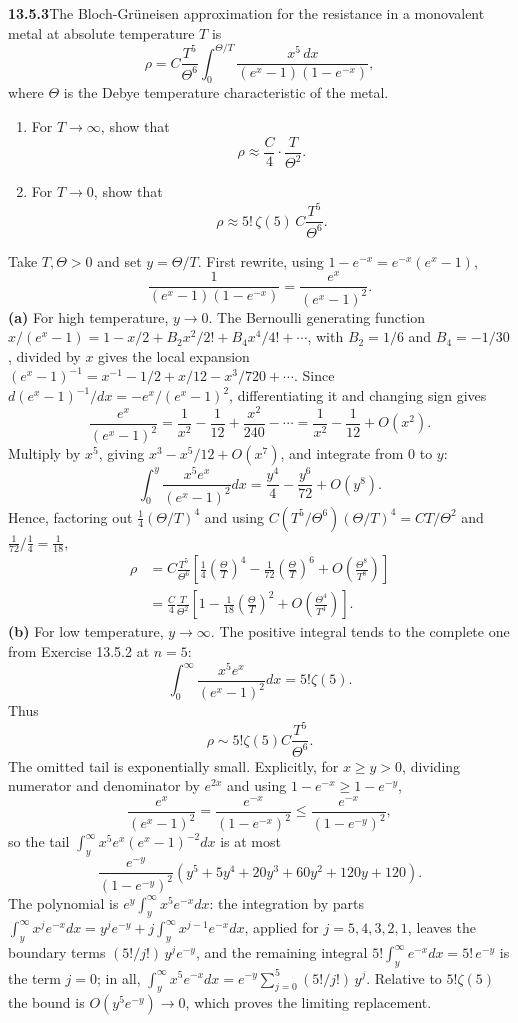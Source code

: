 \par\bigskip
\noindent\textbf{13.5.3}\quad The Bloch-Gr\"uneisen approximation for the
resistance in a monovalent metal at absolute temperature $T$ is
\[
\rho=C\frac{T^{5}}{\Theta^{6}}
\int_{0}^{\Theta/T}\frac{x^{5}\,dx}{(e^{x}-1)(1-e^{-x})},
\]
where $\Theta$ is the Debye temperature characteristic of the metal.
\begin{enumerate}
\item[(a)] For $T\to\infty$, show that
  \[
  \rho\approx\frac{C}{4}\cdot\frac{T}{\Theta^{2}}.
  \]
\item[(b)] For $T\to0$, show that
  \[
  \rho\approx5!\,\zeta(5)\,C\frac{T^{5}}{\Theta^{6}}.
  \]
\end{enumerate}
\solution
Take $T,\Theta>0$ and set $y=\Theta/T$.  First rewrite, using
$1-e^{-x}=e^{-x}(e^x-1)$,
\[
\frac1{(e^x-1)(1-e^{-x})}=\frac{e^x}{(e^x-1)^2}.
\]
\textbf{(a)} For high temperature, $y\to0$.  The Bernoulli
generating function
$x/(e^x-1)=1-x/2+B_2x^2/2!+B_4x^4/4!+\cdots$, with $B_2=1/6$ and
$B_4=-1/30$, divided by $x$ gives the local expansion
$(e^x-1)^{-1}=x^{-1}-1/2+x/12-x^3/720+\cdots$.
Since $d(e^x-1)^{-1}/dx=-e^x/(e^x-1)^2$, differentiating it and
changing sign gives
\[
\frac{e^x}{(e^x-1)^2}=\frac1{x^2}-\frac1{12}+\frac{x^2}{240}-\cdots
=\frac1{x^2}-\frac1{12}+O(x^2).
\]
Multiply by $x^5$, giving $x^3-x^5/12+O(x^7)$, and integrate
from $0$ to $y$:
\[
\int_0^y\frac{x^5e^x}{(e^x-1)^2}dx
=\frac{y^4}{4}-\frac{y^6}{72}+O(y^8).
\]
Hence, factoring out $\frac14(\Theta/T)^4$ and using
$C(T^5/\Theta^6)(\Theta/T)^4=CT/\Theta^2$ and
$\frac1{72}\big/\frac14=\frac1{18}$,
\begin{align*}
\rho&=C\frac{T^5}{\Theta^6}
\left[\frac14\left(\frac\Theta T\right)^4
-\frac1{72}\left(\frac\Theta T\right)^6
+O\left(\frac{\Theta^8}{T^8}\right)\right]\\
&=\boxed{\frac C4\frac T{\Theta^2}}
\left[1-\frac1{18}\left(\frac\Theta T\right)^2
+O\left(\frac{\Theta^4}{T^4}\right)\right].
\end{align*}
\textbf{(b)} For low temperature, $y\to\infty$.  The positive
integral tends to the complete one from Exercise 13.5.2 at $n=5$:
\[
\int_0^\infty\frac{x^5e^x}{(e^x-1)^2}dx=5!\zeta(5).
\]
Thus
\[
\boxed{\rho\sim5!\zeta(5)C\frac{T^5}{\Theta^6}}.
\]
The omitted tail is exponentially small.  Explicitly, for $x\ge y>0$,
dividing numerator and denominator by $e^{2x}$ and using
$1-e^{-x}\ge1-e^{-y}$,
\[
\frac{e^x}{(e^x-1)^2}=\frac{e^{-x}}{(1-e^{-x})^2}
\le\frac{e^{-x}}{(1-e^{-y})^2},
\]
so the tail $\int_y^\infty x^5e^x(e^x-1)^{-2}dx$ is at most
\[
\frac{e^{-y}}{(1-e^{-y})^2}
\left(y^5+5y^4+20y^3+60y^2+120y+120\right).
\]
The polynomial is $e^y\int_y^\infty x^5e^{-x}dx$: the integration
by parts
$\int_y^\infty x^je^{-x}dx=y^je^{-y}+j\int_y^\infty x^{j-1}e^{-x}dx$,
applied for $j=5,4,3,2,1$, leaves the boundary terms
$(5!/j!)\,y^je^{-y}$, and the remaining integral
$5!\int_y^\infty e^{-x}dx=5!\,e^{-y}$ is the term $j=0$; in all,
$\int_y^\infty x^5e^{-x}dx=e^{-y}\sum_{j=0}^5(5!/j!)\,y^j$.
Relative to $5!\zeta(5)$ the bound is $O(y^5e^{-y})\to0$, which
proves the limiting replacement.


